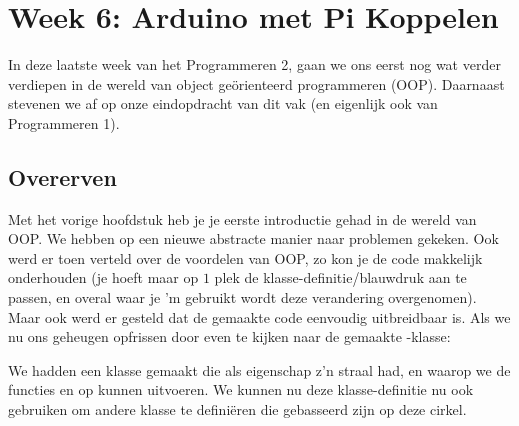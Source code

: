 \chapter{Week 6: Arduino met Pi Koppelen}

In deze laatste week van het Programmeren 2, gaan we ons eerst nog wat verder verdiepen in de wereld van object geörienteerd programmeren (OOP). Daarnaast stevenen we af op onze eindopdracht van dit vak (en eigenlijk ook van Programmeren 1).

\section{Overerven}
Met het vorige hoofdstuk heb je je eerste introductie gehad in de wereld van OOP. We hebben op een nieuwe abstracte manier naar problemen gekeken. Ook werd er toen verteld over de voordelen van OOP, zo kon je de code makkelijk onderhouden (je hoeft maar op $1$ plek de klasse-definitie/blauwdruk aan te passen, en overal waar je 'm gebruikt wordt deze verandering overgenomen). Maar ook werd er gesteld dat de gemaakte code eenvoudig uitbreidbaar is. Als we nu ons geheugen opfrissen door even te kijken naar de gemaakte -klasse:


We hadden een klasse  gemaakt die als eigenschap z'n straal had, en waarop we de functies  en  op kunnen uitvoeren. We kunnen nu deze klasse-definitie nu ook gebruiken om andere klasse te definiëren die gebasseerd zijn op deze cirkel. \newline 

